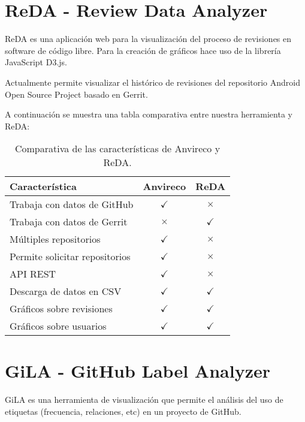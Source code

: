 \section{ReDA - Review Data Analyzer}

ReDA \cite{reda2014} es una aplicación web para la visualización del proceso de revisiones en software de código libre. Para la creación de gráficos hace uso de la librería JavaScript D3.js.

Actualmente permite visualizar el histórico de revisiones del repositorio Android Open Source Project basado en Gerrit.

A continuación se muestra una tabla comparativa entre nuestra herramienta y ReDA:

\begin{table}[H]
\centering
\begin{tabular}{lcc}
\toprule
Característica & Anvireco & ReDA \\
\midrule
Trabaja con datos de GitHub & \cellcolor{green!25} {$\checkmark$} & \cellcolor{red!25} {$\times$} \\
Trabaja con datos de Gerrit & \cellcolor{red!25} {$\times$} & \cellcolor{green!25} {$\checkmark$} \\
Múltiples repositorios & \cellcolor{green!25} {$\checkmark$} & \cellcolor{red!25} {$\times$} \\
Permite solicitar repositorios & \cellcolor{green!25} {$\checkmark$} & \cellcolor{red!25} {$\times$} \\
API REST & \cellcolor{green!25} {$\checkmark$} & \cellcolor{red!25} {$\times$} \\
Descarga de datos en CSV & \cellcolor{green!25} {$\checkmark$} & \cellcolor{green!25} {$\checkmark$} \\
Gráficos sobre revisiones & \cellcolor{green!25} {$\checkmark$} & \cellcolor{green!25} {$\checkmark$} \\
Gráficos sobre usuarios & \cellcolor{green!25} {$\checkmark$} & \cellcolor{green!25} {$\checkmark$} \\
\bottomrule
\end{tabular}
\caption{Comparativa de las características de Anvireco y ReDA.}
\label{comparativa-anvireco-reda}
\end{table}

\section{GiLA - GitHub Label Analyzer}

GiLA \cite{gila} es una herramienta de visualización que permite el análisis del uso de etiquetas (frecuencia, relaciones, etc) en un proyecto de GitHub.

